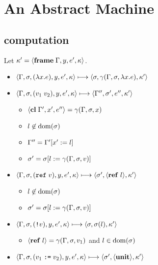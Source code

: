 \documentclass{article}
\begin{document}
\section{An Abstract Machine}
\begin{minipage}{\textwidth}
\begin{minipage}[t]{0.50\textwidth}

\subsection{computation}
Let $\kappa' = \langle\mathbf{frame}\; \Gamma,y,e',\kappa\rangle$.
\begin{itemize}
\item $\langle\Gamma,\sigma,(\lambda x.e),y,e',\kappa\rangle \longmapsto \langle \sigma,\gamma(\Gamma,\sigma,\lambda x.e), \kappa'\rangle$
\item $\langle\Gamma,\sigma,(v_1\;v_2),y,e',\kappa\rangle \longmapsto \langle\Gamma'',\sigma',e'',\kappa'\rangle$

\begin{itemize}
\item $\langle\mathbf{cl}\; \Gamma',x',e''\rangle=\gamma(\Gamma,\sigma,x)$
\item $l\not\in\operatorname{dom}(\sigma)$
\item $\Gamma''=\Gamma'[x':= l]$
\item $\sigma'=\sigma[l:= \gamma(\Gamma,\sigma,v)]$
\end{itemize}

\item $\langle\Gamma,\sigma,(\mathtt{ref}\; v),y,e',\kappa\rangle \longmapsto \langle\sigma', \langle\mathbf{ref}\; l\rangle,\kappa'\rangle$

\begin{itemize}
  \item $l\not\in\operatorname{dom}(\sigma)$
  \item $\sigma'=\sigma[l:= \gamma(\Gamma,\sigma,v)]$
\end{itemize}

\item $\langle\Gamma,\sigma,(\text{\texttt{!}}v),y,e',\kappa\rangle \longmapsto \langle\sigma, \sigma(l),\kappa'\rangle$

\begin{itemize}
\item $\langle\mathbf{ref}\; l\rangle=\gamma(\Gamma,\sigma,v_1)$ and $l\in\operatorname{dom}(\sigma)$
\end{itemize}

\item $\langle\Gamma,\sigma,(v_1\; \text{\texttt{:=}}\; v_2),y,e',\kappa\rangle \longmapsto \langle\sigma',\langle\mathbf{unit}\rangle,\kappa'\rangle$


\end{itemize}
\end{minipage}
\end{minipage}
\end{document}
